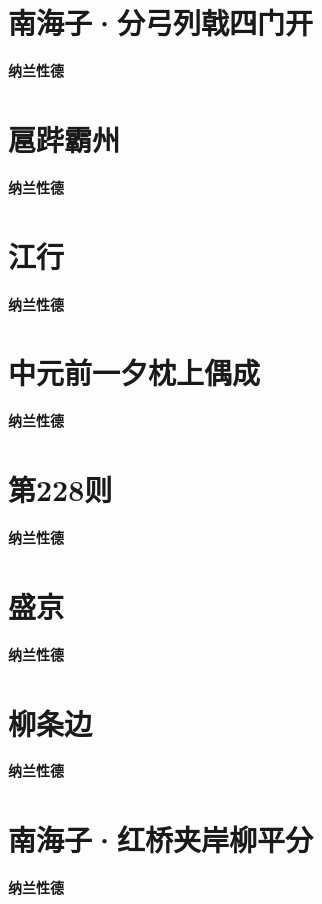 \documentclass[12pt,a4paper]{ctexbook}
\begin{document}
\section{南海子·分弓列戟四门开}
\textbf{纳兰性德}\par\vspace{0.5em}

\section{扈跸霸州}
\textbf{纳兰性德}\par\vspace{0.5em}

\section{江行}
\textbf{纳兰性德}\par\vspace{0.5em}

\section{中元前一夕枕上偶成}
\textbf{纳兰性德}\par\vspace{0.5em}

\section{第228则}
\textbf{纳兰性德}\par\vspace{0.5em}

\section{盛京}
\textbf{纳兰性德}\par\vspace{0.5em}

\section{柳条边}
\textbf{纳兰性德}\par\vspace{0.5em}

\section{南海子·红桥夹岸柳平分}
\textbf{纳兰性德}\par\vspace{0.5em}
\end{document}
